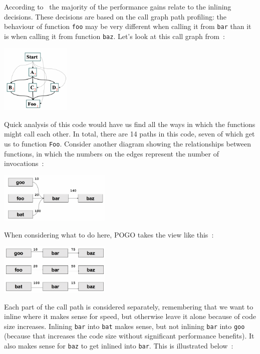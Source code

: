\documentclass[a4paper]{report}
\begin{document}
According to~\cite{pogo2} the majority of the performance gains relate to the inlining decisions. These decisions are based on the call graph path profiling: the behaviour of function \texttt{foo} may be very different when calling it from \texttt{bar} than it is when calling it from function \texttt{baz}. Let's look at this call graph from~\cite{pogo2}:

\begin{center}
	\includegraphics[width=0.25\textwidth]{images/callpaths.png}
\end{center}

Quick analysis of this code would have us find all the ways in which the functions might call each other. In total, there are 14 paths in this code, seven of which get us to function \texttt{Foo}. Consider another diagram showing the relationships between functions, in which the numbers on the edges represent the number of invocations~\cite{pogo2}:

\begin{center}
	\includegraphics[width=0.4\textwidth]{images/callpaths2.png}
\end{center}

When considering what to do here, POGO takes the view like this~\cite{pogo2}:

\begin{center}
	\includegraphics[width=0.4\textwidth]{images/callpaths3.png}
\end{center}

Each part of the call path is considered separately, remembering that we want to inline where it makes sense for speed, but otherwise leave it alone because of code size increases. Inlining \texttt{bar} into \texttt{bat} makes sense, but not inlining \texttt{bar} into \texttt{goo} (because that increases the code size without significant performance benefits). It also makes sense for \texttt{baz} to get inlined into \texttt{bar}. This is illustrated below~\cite{pogo2}:
\end{document}
